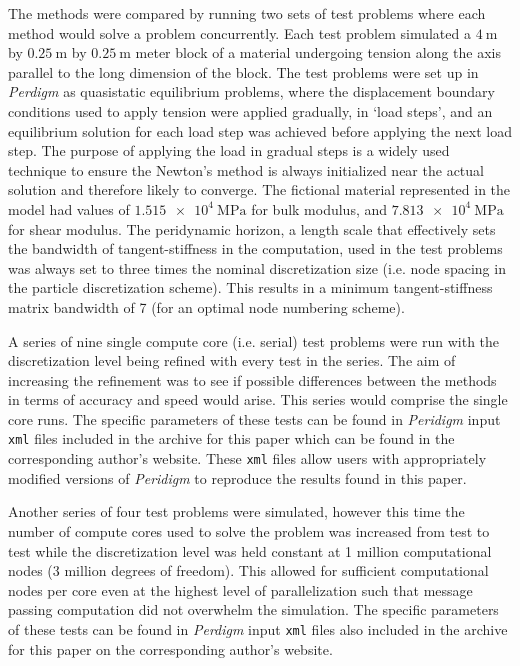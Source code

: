 \documentclass[preprint,12pt]{elsarticle}
\begin{document}
The methods were compared by running two sets of test problems where each method would solve a problem concurrently. Each test problem simulated a $\SI{4}{\meter}$ by $\SI{0.25}{\meter}$ by $\SI{0.25}{\meter}$ meter block of a material undergoing tension along the axis parallel to the long dimension of the block. The test problems were set up in \emph{Perdigm} as quasistatic equilibrium problems, where the displacement boundary conditions used to apply tension were applied gradually, in `load steps', and an equilibrium solution for each load step was achieved before applying the next load step. The purpose of applying the load in gradual steps is a widely used technique to ensure the Newton's method is always initialized near the actual solution and therefore likely to converge. The fictional material represented in the model had values of $\SI{1.515e4}{\mega\pascal}$ for bulk modulus, and $\SI{7.813e4}{\mega\pascal}$ for shear modulus. The peridynamic horizon, a length scale that effectively sets the bandwidth of tangent-stiffness in the computation, used in the test problems was always set to three times the nominal discretization size (i.e. node spacing in the particle discretization scheme). This results in a minimum tangent-stiffness matrix bandwidth of 7 (for an optimal node numbering scheme).

A series of nine single compute core (i.e. serial) test problems were run with the discretization level being refined with every test in the series. The aim of increasing the refinement was to see if possible differences between the methods in terms of accuracy and speed would arise. This series would comprise the single core runs. The specific parameters of these tests can be found in \emph{Peridigm} input {\tt xml} files included in the archive for this paper which can be found in the corresponding author's website. These {\tt xml} files allow users with appropriately modified versions of \emph{Peridigm} to reproduce the results found in this paper.

Another series of four test problems were simulated, however this time the number of compute cores used to solve the problem was increased from test to test while the discretization level was held constant at 1 million computational nodes (3 million degrees of freedom). This allowed for sufficient computational nodes per core even at the highest level of parallelization such that message passing computation did not overwhelm the simulation.   The specific parameters of these tests can be found in \emph{Perdigm} input {\tt xml} files also included in the archive for this paper on the corresponding author's website.
\end{document}

